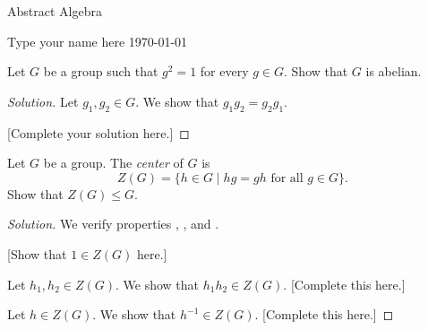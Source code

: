 \documentclass{article}
\begin{document}
{\small {\sc Abstract Algebra}}
\hspace{2.4 cm}

\noindent
\hspace{2.5 cm}
{\small {\sc Type your name here} }
\hspace{2 cm}
{\normalsize \today}

\vspace{0.5 cm}

\setcounter{Prob}{1}

\begin{Prob}
Let $G$ be a group such that $g^2 = 1$ for every $g \in G$.
Show that $G$ is abelian.
\end{Prob}

\begin{proof}[Solution]
Let $g_1,g_2 \in G$.  We show that $g_1 g_2 = g_2 g_1$.

[Complete your solution here.]
\end{proof}

\begin{Prob}
Let $G$ be a group.  The {\em center} of $G$ is
\[ Z(G) = \{ h \in G \mid hg = gh \text{ for all } g \in G \} . \]
Show that $Z(G) \le G$.
\end{Prob}

\begin{proof}[Solution]
We verify properties , , and .

 [Show that $1 \in Z(G)$ here.]

 Let $h_1,h_2 \in Z(G)$.  We show that $h_1 h_2 \in Z(G)$.
[Complete this here.]

 Let $h \in Z(G)$.  We show that $h^{-1} \in Z(G)$.
[Complete this here.]
\end{proof}
\end{document}
